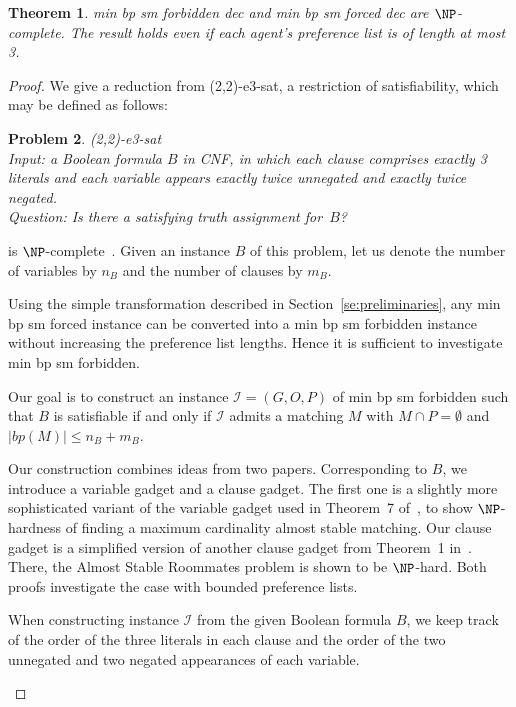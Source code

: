 \documentclass[preprint,12pt]{elsarticle}
\newtheorem{theorem}{Theorem}[section]
\newtheorem{pr}[theorem]{Problem}
\begin{document}
\begin{theorem}
\label{th:minbp33}
	{\sc min bp sm forbidden dec} and {\sc min bp sm forced dec} are $\NP$-complete.  The result holds even if each agent's preference list is of length at most 3.
\end{theorem}
\begin{proof} We give a reduction from {\sc (2,2)-e3-sat}, a restriction of {\sc satisfiability}, which may be defined as follows:
\begin{pr}{\sc (2,2)-e3-sat}\ \\
	Input: a Boolean formula $B$ in CNF, in which each clause comprises exactly 3 literals and each variable appears exactly twice unnegated and exactly twice negated. \\
	Question: Is there a satisfying truth assignment for~$B$?
\end{pr}
 is $\NP$-complete~\cite{BKS03}.  Given an instance $B$ of this problem, let us denote the number of variables by $n_B$ and the number of clauses by $m_B$.

Using the simple transformation described in Section~\ref{se:preliminaries}, any {\sc min bp sm forced} instance can be converted into a {\sc min bp sm forbidden} instance without increasing the preference list lengths.  Hence it is sufficient to investigate {\sc min bp sm forbidden}.

Our goal is to construct an instance $\mathcal{I}=(G,O,P)$ of {\sc min bp sm forbidden} such that $B$ is satisfiable if and only if $\mathcal I$ admits a matching $M$ with $M\cap P=\emptyset$ and $|bp(M)|\leq n_B+m_B$.
	
Our construction combines ideas from two papers. Corresponding to $B$, we introduce a variable gadget and a clause gadget. The first one is a slightly more sophisticated variant of the variable gadget used in Theorem~7 of~\cite{BMM10}, to show $\NP$-hardness of finding a maximum cardinality almost stable matching. Our clause gadget is a simplified version of another clause gadget from Theorem~1 in~\cite{BMM12}. There, the Almost Stable Roommates problem is shown to be $\NP$-hard. Both proofs investigate the case with bounded preference lists.

When constructing instance $\mathcal I$ from the given Boolean formula $B$, we keep track of the order of the three literals in each clause and the order of the two unnegated and two negated appearances of each variable. 
	
\begin{center}
\begin{figure}[h!]
\end{figure}
\end{center}
\end{proof}
\end{document}
